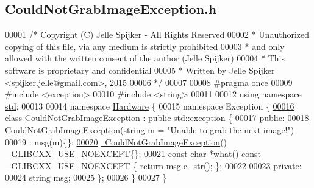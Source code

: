 \hypertarget{_could_not_grab_image_exception_8h_source}{}\subsection{Could\+Not\+Grab\+Image\+Exception.\+h}
\label{_could_not_grab_image_exception_8h_source}

\begin{DoxyCode}
00001 \textcolor{comment}{/* Copyright (C) Jelle Spijker - All Rights Reserved}
00002 \textcolor{comment}{ * Unauthorized copying of this file, via any medium is strictly prohibited}
00003 \textcolor{comment}{ * and only allowed with the written consent of the author (Jelle Spijker)}
00004 \textcolor{comment}{ * This software is proprietary and confidential}
00005 \textcolor{comment}{ * Written by Jelle Spijker <spijker.jelle@gmail.com>, 2015}
00006 \textcolor{comment}{ */}
00007 
00008 \textcolor{preprocessor}{#pragma once}
00009 \textcolor{preprocessor}{#include <exception>}
00010 \textcolor{preprocessor}{#include <string>}
00011 
00012 \textcolor{keyword}{using namespace }\hyperlink{namespacestd}{std};
00013 
00014 \textcolor{keyword}{namespace }\hyperlink{namespace_hardware}{Hardware} \{
00015 \textcolor{keyword}{namespace }Exception \{
\hypertarget{_could_not_grab_image_exception_8h_source_l00016}{}\hyperlink{class_hardware_1_1_exception_1_1_could_not_grab_image_exception}{00016} \textcolor{keyword}{class }\hyperlink{class_hardware_1_1_exception_1_1_could_not_grab_image_exception}{CouldNotGrabImageException} : \textcolor{keyword}{public} std::exception \{
00017 \textcolor{keyword}{public}:
\hypertarget{_could_not_grab_image_exception_8h_source_l00018}{}\hyperlink{class_hardware_1_1_exception_1_1_could_not_grab_image_exception_a8bddfebe4a59346dbddae7f8bf85af8a}{00018}   \hyperlink{class_hardware_1_1_exception_1_1_could_not_grab_image_exception_a8bddfebe4a59346dbddae7f8bf85af8a}{CouldNotGrabImageException}(\textcolor{keywordtype}{string} m = \textcolor{stringliteral}{"Unable to grab the next image!"})
00019       : msg(m)\{\};
\hypertarget{_could_not_grab_image_exception_8h_source_l00020}{}\hyperlink{class_hardware_1_1_exception_1_1_could_not_grab_image_exception_a8f476ae2d11458f632ba2ecfd9016cb3}{00020}   \hyperlink{class_hardware_1_1_exception_1_1_could_not_grab_image_exception_a8f476ae2d11458f632ba2ecfd9016cb3}{~CouldNotGrabImageException}() \_GLIBCXX\_USE\_NOEXCEPT\{\};
\hypertarget{_could_not_grab_image_exception_8h_source_l00021}{}\hyperlink{class_hardware_1_1_exception_1_1_could_not_grab_image_exception_a1d4483097dc5dc87a90380988999b9fd}{00021}   \textcolor{keyword}{const} \textcolor{keywordtype}{char} *\hyperlink{class_hardware_1_1_exception_1_1_could_not_grab_image_exception_a1d4483097dc5dc87a90380988999b9fd}{what}() const \_GLIBCXX\_USE\_NOEXCEPT \{ \textcolor{keywordflow}{return} msg.c\_str(); \};
00022 
00023 \textcolor{keyword}{private}:
00024   \textcolor{keywordtype}{string} msg;
00025 \};
00026 \}
00027 \}
\end{DoxyCode}
